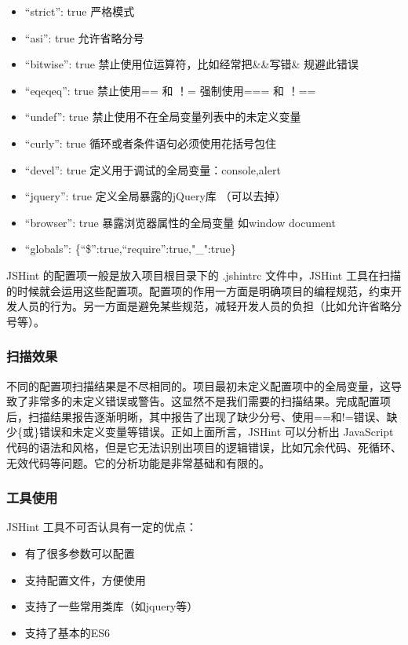 \documentclass[hyperref, a4paper]{ctexart}
\providecommand{\tightlist}{%
  \setlength{\itemsep}{0pt}\setlength{\parskip}{0pt}}
\begin{document}
\begin{itemize}
\tightlist
\item
  ``strict'': true 严格模式
\item
  ``asi'': true 允许省略分号
\item
  ``bitwise'': true 禁止使用位运算符，比如经常把\&\&写错\& 规避此错误
\item
  ``eqeqeq'': true 禁止使用== 和 ！= 强制使用=== 和 ！==
\item
  ``undef'': true 禁止使用不在全局变量列表中的未定义变量
\item
  ``curly'': true 循环或者条件语句必须使用花括号包住
\item
  ``devel'': true 定义用于调试的全局变量：console,alert
\item
  ``jquery'': true 定义全局暴露的jQuery库 （可以去掉）
\item
  ``browser'': true 暴露浏览器属性的全局变量 如window document
\item
  ``globals'': \{``\$'':true,``require'':true,"\_":true\}
\end{itemize}

JSHint 的配置项一般是放入项目根目录下的 .jshintrc 文件中，JSHint
工具在扫描的时候就会运用这些配置项。配置项的作用一方面是明确项目的编程规范，约束开发人员的行为。另一方面是避免某些规范，减轻开发人员的负担（比如允许省略分号等）。

\hypertarget{ux626bux63cfux6548ux679c-2}{%
\subsubsection{扫描效果}\label{ux626bux63cfux6548ux679c-2}}

不同的配置项扫描结果是不尽相同的。项目最初未定义配置项中的全局变量，这导致了非常多的未定义错误或警告。这显然不是我们需要的扫描结果。完成配置项后，扫描结果报告逐渐明晰，其中报告了出现了缺少分号、使用==和!=错误、缺少\{或\}错误和未定义变量等错误。正如上面所言，JSHint
可以分析出 JavaScript
代码的语法和风格，但是它无法识别出项目的逻辑错误，比如冗余代码、死循环、无效代码等问题。它的分析功能是非常基础和有限的。

\hypertarget{ux5de5ux5177ux4f7fux7528}{%
\subsubsection{工具使用}\label{ux5de5ux5177ux4f7fux7528}}

JSHint 工具不可否认具有一定的优点：

\begin{itemize}
\tightlist
\item
  有了很多参数可以配置
\item
  支持配置文件，方便使用
\item
  支持了一些常用类库（如jquery等）
\item
  支持了基本的ES6
\end{itemize}
\end{document}
